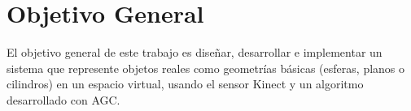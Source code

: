 \section{Objetivo General}

    El objetivo general de este trabajo es diseñar, desarrollar e implementar un sistema que represente objetos reales como geometrías básicas (\glspl{esfera}, \glspl{plano} o \glspl{cilindro}) en un espacio virtual, usando el sensor Kinect y un algoritmo desarrollado con AGC.\\